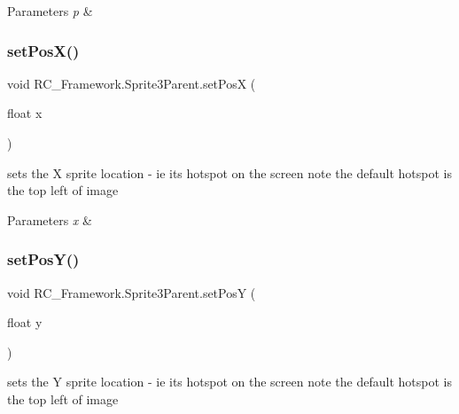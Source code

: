 \begin{DoxyParams}{Parameters}
{\em p} & \\
\hline
\end{DoxyParams}
\mbox{\label{class_r_c___framework_1_1_sprite3_parent_ae8cc0fe44090f72c9c9f38826ba0bd3f}} 
\subsubsection{\texorpdfstring{set\+Pos\+X()}{setPosX()}}
{\footnotesize\ttfamily void R\+C\+\_\+\+Framework.\+Sprite3\+Parent.\+set\+PosX (\begin{DoxyParamCaption}\item[{float}]{x }\end{DoxyParamCaption})}



sets the X sprite location -\/ ie its hotspot on the screen note the default hotspot is the top left of image 


\begin{DoxyParams}{Parameters}
{\em x} & \\
\hline
\end{DoxyParams}
\mbox{\label{class_r_c___framework_1_1_sprite3_parent_aacc2ace291d75d78005ab8d3f837a1af}} 
\subsubsection{\texorpdfstring{set\+Pos\+Y()}{setPosY()}}
{\footnotesize\ttfamily void R\+C\+\_\+\+Framework.\+Sprite3\+Parent.\+set\+PosY (\begin{DoxyParamCaption}\item[{float}]{y }\end{DoxyParamCaption})}



sets the Y sprite location -\/ ie its hotspot on the screen note the default hotspot is the top left of image 


